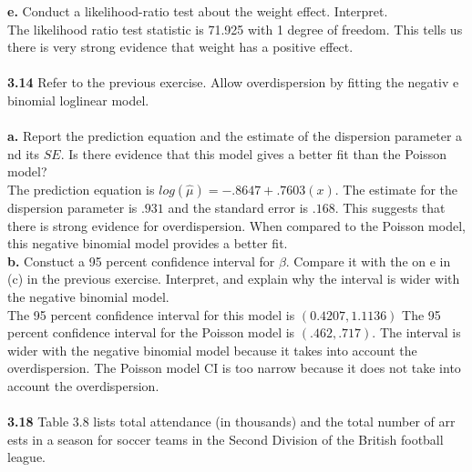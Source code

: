 \documentclass[paper=letter, fontsize=11pt]{scrartcl} %
\begin{document}
\textbf{e.} Conduct a likelihood-ratio test about the weight effect. Interpret. \\

The likelihood ratio test statistic is 71.925 with 1 degree of freedom. This tells us 
there is very strong evidence that weight has a positive effect.\\
\\

\textbf{3.14} Refer to the previous exercise. Allow overdispersion by fitting the negativ
e binomial loglinear model. \\
\\

\textbf{a.} Report the prediction equation and the estimate of the dispersion parameter a
nd its $SE$. Is there evidence that this model gives a better fit than the Poisson model?
\\
The prediction equation is $log(\hat{\mu})= -.8647 + .7603(x)$. The estimate for the 
dispersion parameter is $.931$ and the standard error is $.168$. This suggests that there
is strong evidence for overdispersion. When compared to the Poisson model, this negative
binomial model provides a better fit. \\

\textbf{b.} Constuct a 95 percent confidence interval for $\beta$. Compare it with the on
e in (c) in the previous exercise. Interpret, and explain why the interval is wider with 
the negative binomial model. \\

The 95 percent confidence interval for this model is $(0.4207, 1.1136)$ The 95 percent 
confidence interval for the Poisson model is $(.462, .717)$. The interval is wider with 
the negative binomial model because it takes into account the overdispersion. The Poisson
model CI is too narrow because it does not take into account the overdispersion. \\
\\

\textbf{3.18} Table 3.8 lists total attendance (in thousands) and the total number of arr
ests in a season for soccer teams in the Second Division of the British football league.
\\
\end{document}
